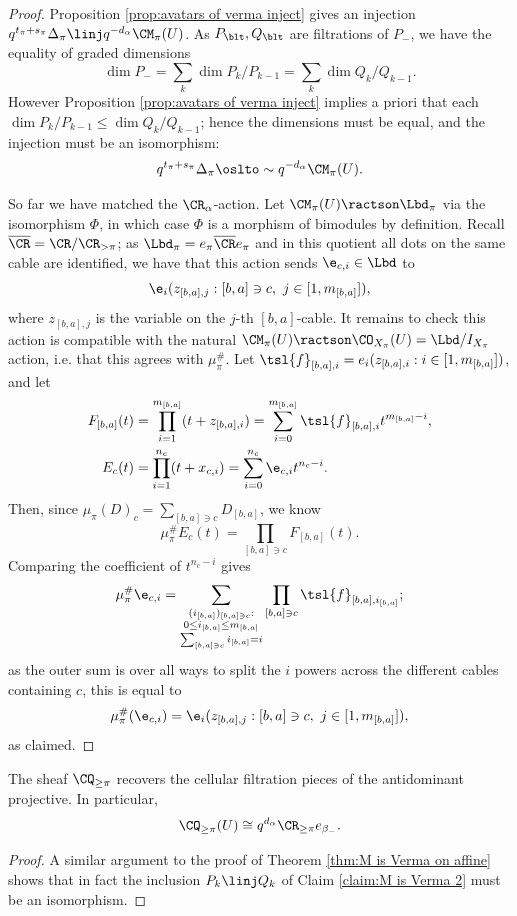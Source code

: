 \documentclass[11pt,reqno]{amsart}
\renewcommand{\f}{\tsl{f}}
\begin{document}
\begin{proof}
    Proposition \ref{prop:avatars of verma inject} gives an injection $q^{t_\pi+s_\pi}\Delta_{\pi}\linj q^{-d_\alpha}\CM_\pi(U)$. As $P_\blt,Q_\blt$ are filtrations of $P_-$, we have the equality of graded dimensions
    \[\dim P_-=\sum_k \dim P_k/P_{k-1}=\sum_k \dim Q_k/Q_{k-1}.\] 
    However Proposition \ref{prop:avatars of verma inject} implies a priori that each $\dim P_k/P_{k-1}\le\dim Q_k/Q_{k-1}$; hence the dimensions must be equal, and the injection must be an isomorphism:
    \[q^{t_\pi+s_\pi}\Delta_{\pi}\simlto q^{-d_\alpha}\CM_\pi(U).\] 

    So far we have matched the $\CR_\alpha$-action. Let $\CM_\pi(U)\ractson \Lbd_\pi$ via the isomorphism $\Phi$, in which case $\Phi$ is a morphism of bimodules by definition. Recall $\ol\CR=\CR/\CR_{>\pi}$; as $\Lbd_\pi=e_\pi \ol\CR e_\pi$ and in this quotient all dots on the same cable are identified, we have that this action sends $\e_{c,i}\in\Lbd$ to 
    \[\e_i(z_{[b,a],j}:[b,a]\ni c,\ j\in[1,m_{[b,a]}]),\]
    where $z_{[b,a],j}$ is the variable on the $j$-th $[b,a]$-cable. It remains to check this action is compatible with the natural $\CM_\pi(U)\ractson \CO_{X_\pi}(U)=\Lbd/I_{X_\pi}$ action, i.e. that this agrees with $\mu_\pi^\#$. Let $\f_{[b,a],i}=e_i(z_{[b,a],i}:i\in[1,m_{[b,a]}])$, and let
    \begin{align*}
        F_{[b,a]}(t)&=\prod_{i=1}^{m_{[b,a]}} (t+z_{[b,a],i})=\sum_{i=0}^{m_{[b,a]}}\f_{[b,a],i}t^{m_{[b,a]}-i},\\
        E_c(t)&=\prod_{i=1}^{n_c} (t+x_{c,i})=\sum_{i=0}^{n_c}\e_{c,i} t^{n_c-i}.
    \end{align*}
    Then, since $\mu_\pi(D)_c=\sum_{[b,a]\ni c} D_{[b,a]}$, we know
    \[\mu_\pi^\# E_c(t)=\prod_{[b,a]\ni c}F_{[b,a]}(t).\] 
    Comparing the coefficient of $t^{n_c-i}$ gives
    \[\mu_\pi^\#\e_{c,i}=\sum_{\substack{(i_{[b,a]})_{[b,a]\ni c}:\\0\le i_{[b,a]}\le m_{[b,a]}\\ \sum_{[b,a]\ni c} i_{[b,a]}=i}}\prod_{[b,a]\ni c}\f_{[b,a],i_{[b,a]}};\] 
    as the outer sum is over all ways to split the $i$ powers across the different cables containing $c$, this is equal to 
    \[\mu_\pi^\#(\e_{c,i})=\e_i(z_{[b,a],j}:[b,a]\ni c,\ j\in[1,m_{[b,a]}]),\] 
    as claimed.
\end{proof}


\begin{corollary}
    The sheaf $\CQ_{\ge\pi}$ recovers the cellular filtration pieces of the antidominant projective. In particular, 
    \[\CQ_{\ge\pi}(U)\cong q^{d_\alpha}\CR_{\ge\pi} e_{\beta_-}.\]
\end{corollary}
\begin{proof}
    A similar argument to the proof of Theorem \ref{thm:M is Verma on affine} shows that in fact the inclusion $P_k\linj Q_k$ of Claim \ref{claim:M is Verma 2} must be an isomorphism.
\end{proof}
\end{document}
